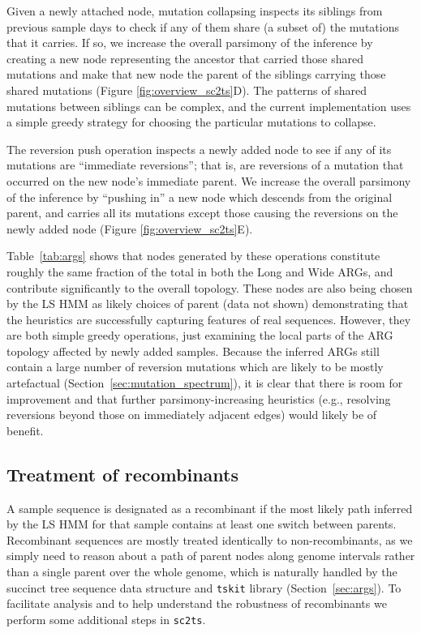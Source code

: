 \documentclass{article}
\begin{document}
Given a newly attached node, mutation collapsing inspects its siblings from
previous sample days to check if any of them share (a subset of) the mutations that
it carries. If so, we increase the overall parsimony of the inference
by creating a new node representing the ancestor that carried
those shared mutations and make that new node the parent of the
siblings carrying those shared mutations (Figure \ref{fig:overview_sc2ts}D). The patterns of
shared mutations between siblings can be complex, and the current
implementation uses a simple greedy strategy for choosing
the particular mutations to collapse.

The reversion push operation inspects a newly added node to see
if any of its mutations are ``immediate reversions''; that is,
are reversions of a mutation that occurred on the new node's
immediate parent. We increase the overall parsimony of the
inference by ``pushing in'' a new node which descends from the
original parent, and carries all its mutations except those
causing the reversions on the newly added node (Figure \ref{fig:overview_sc2ts}E).

Table~\ref{tab:args} shows that nodes generated by
these operations constitute
roughly the same fraction of the total in both the Long and Wide ARGs,
and contribute significantly to the overall topology.
These nodes are also being chosen by the
LS HMM as likely choices of parent (data not shown)
demonstrating that the heuristics are successfully
capturing features of real sequences.
However, they are both simple
greedy operations, just examining the local parts of the
ARG topology affected by newly added samples. Because the inferred
ARGs still contain a large number of reversion mutations which
are likely to be mostly artefactual (Section~\ref{sec:mutation_spectrum}),
it is clear that there
is room for improvement and that further parsimony-increasing
heuristics
(e.g., resolving reversions beyond those on immediately adjacent edges)
would likely be of benefit.

\subsection{Treatment of recombinants}
\label{sec:treatment_recombinants}
A sample sequence is designated as a recombinant if the most likely
path inferred by the LS HMM for that sample contains at least
one switch between parents. Recombinant sequences are mostly treated
identically to non-recombinants, as we simply need to reason about
a path of parent nodes along genome intervals rather than a
single parent over the whole genome, which is naturally handled by
the succinct tree sequence data structure and \texttt{tskit} library
(Section~\ref{sec:args}). To facilitate
analysis and to help understand the robustness of recombinants
we perform some additional steps in \texttt{sc2ts}.
\end{document}
